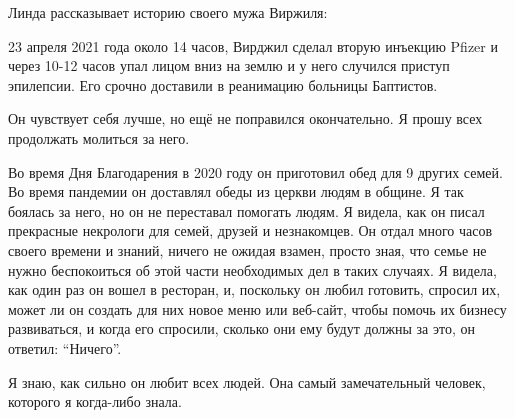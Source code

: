 Линда рассказывает историю своего мужа Виржиля:

23 апреля 2021 года около 14 часов, Вирджил сделал вторую инъекцию Pfizer и
через 10-12 часов упал лицом вниз на землю и у него случился приступ
эпилепсии. Его срочно доставили в реанимацию больницы Баптистов.

Он чувствует себя лучше, но ещё не поправился окончательно. Я прошу всех
продолжать молиться за него.

Во время Дня Благодарения в 2020 году он приготовил обед для 9 других семей. Во
время пандемии он доставлял обеды из церкви людям в общине. Я так боялась за
него, но он не переставал помогать людям. Я видела, как он писал прекрасные
некрологи для семей, друзей и незнакомцев. Он отдал много часов своего времени и
знаний, ничего не ожидая взамен, просто зная, что семье не нужно беспокоиться об
этой части необходимых дел в таких случаях. Я видела, как один раз он вошел в
ресторан, и, поскольку он любил готовить, спросил их, может ли он создать для
них новое меню или веб-сайт, чтобы помочь их бизнесу развиваться, и когда его
спросили, сколько они ему будут должны за это, он ответил: “Ничего”.

Я знаю, как сильно он любит всех людей. Она самый замечательный человек,
которого я когда-либо знала.
